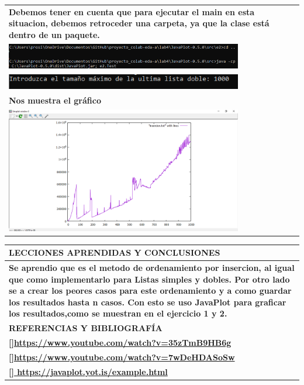 \documentclass[9pt]{article}
\begin{document}
\begin{longtable}{|p{15cm}|}
		\textbf{Debemos tener en cuenta que para ejecutar el main en esta situacion, debemos retroceder una carpeta, ya que la clase está dentro de un paquete.}\\
		\includegraphics[width=0.8\textwidth,keepaspectratio]{img/retrocederyejecutar2.png}\\
		\includegraphics[width=0.8\textwidth,keepaspectratio]{img/ingresaDato2.png}\\
		\textbf{Nos muestra el gráfico}\\
		\includegraphics[width=0.8\textwidth,keepaspectratio]{img/graficoPlot2.png}\\
		
		\hline
	\end{longtable}
	\begin{table}[H]
		\begin{tabular}{|p{15cm}|}
			\hline 
			\rowcolor{tablebackground}
			\color{white}\textbf{LECCIONES APRENDIDAS Y CONCLUSIONES}  \\
			\hline 
			\textbf{Se aprendio que es el metodo de ordenamiento por insercion, 
				al igual que como implementarlo para Listas simples y dobles. Por otro lado se
				a crear los peores casos para este ordenamiento y a como guardar los resultados hasta n casos. Con esto se uso JavaPlot para graficar los resultados,como se muestran en el ejercicio 1 y 2.}  \\
		\hline 
		\rowcolor{tablebackground}
		\color{white}\textbf{REFERENCIAS Y BIBLIOGRAFÍA}  \\
		\hline 
		\textbf{[]\url{https://www.youtube.com/watch?v=35zTmB9HB6g}}\\
		\textbf{[]\url{https://www.youtube.com/watch?v=7wDeHDASoSw}}\\
		\textbf{[]\url{	https://javaplot.yot.is/example.html}}\\
	
		\hline 
	\end{tabular}
\end{table}
\end{document}
